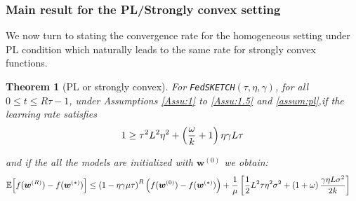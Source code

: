 \documentclass[twoside]{article}
\newtheorem{theorem}{Theorem}
\begin{document}
\subsubsection{Main result for the PL/Strongly convex setting}
 
We now turn to stating the convergence rate for the homogeneous setting under PL condition which naturally leads to the same rate for strongly convex functions.
\begin{theorem}[PL or strongly convex]\label{thm:pl-iid}
For \texttt{FedSKETCH}$(\tau, \eta, \gamma)$, for all $0\leq t\leq R\tau-1$,  under Assumptions \ref{Assu:1} to \ref{Assu:1.5} and \ref{assum:pl},if the learning rate satisfies 
\begin{align}\notag
   1\geq {\tau^2 L^2\eta^2}+\left(\frac{\omega}{k}+1\right){\eta\gamma L}{\tau} 
\end{align}

and if the all the models are initialized with $\boldsymbol{w}^{(0)}$ we obtain:
\begin{align}\notag
        \mathbb{E}\Big[f({\boldsymbol{w}}^{(R)})-f({\boldsymbol{w}}^{(*)})\Big]&\leq \left(1-\eta\gamma{\mu\tau}\right)^R\left(f(\boldsymbol{w}^{(0)})-f(\boldsymbol{w}^{(*)})\right)+\frac{1}{{\mu}}\left[\frac{1}{2} L^2\tau\eta^2\sigma^2+\left(1+\omega\right)\frac{\gamma\eta L\sigma^2}{2k}\right]
\end{align}
\end{theorem}
\end{document}
